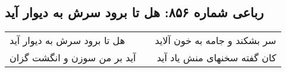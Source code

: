 \begin{center}
\section*{رباعی شماره ۸۵۶: هل تا برود سرش به دیوار آید}
\label{sec:0856}
\begin{longtable}{l p{0.5cm} r}
هل تا برود سرش به دیوار آید
&&
سر بشکند و جامه به خون آلاید
\\
آید بر من سوزن و انگشت گزان
&&
کان گفته سخنهای منش یاد آید
\\
\end{longtable}
\end{center}
